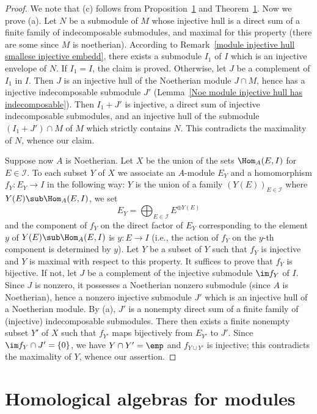\begin{proof}
We note that (c) follows from Proposition~\ref{} and Theorem~\ref{}. Now we prove (a). Let $N$ be a submodule of $M$ whose injective hull is a direct sum of a finite family of indecomposable submodules, and maximal for this property (there are some since $M$ is noetherian). According to Remark~\ref{module injective hull smallese injective embedd}, there exists a submodule $I_1$ of $I$ which is an injective envelope of $N$. If $I_1=I$, the claim is proved. Otherwise, let $J$ be a complement of $I_1$ in $I$. Then $J$ is an injective hull of the Noetherian module $J\cap M$, hence has a injective indecomposable submodule $J'$ (Lemma~\ref{Noe module injective hull has indecomposable}). Then $I_1+J'$ is injective, a direct sum of injective indecomposable submodules, and an injective hull of the submodule $(I_1+J')\cap M$ of $M$ which strictly contains $N$. This contradicts the maximality of $N$, whence our claim.\par
Suppose now $A$ is Noetherian. Let $X$ be the union of the sets $\Hom_A(E,I)$ for $E\in\mathscr{I}$. To each subset $Y$ of $X$ we associate an $A$-module $E_Y$ and a homomorphism $f_Y:E_Y\to I$ in the following way: $Y$ is the union of a family $(Y(E))_{E\in\mathscr{I}}$ where $Y(E)\sub\Hom_A(E,I)$, we set
\[E_Y=\bigoplus_{E\in\mathscr{I}}E^{\oplus Y(E)}\]
and the component of $f_Y$ on the direct factor of $E_Y$ corresponding to the element $y$ of $Y(E)\sub\Hom_A(E,I)$ is $y:E\to I$ (i.e., the action of $f_Y$ on the $y$-th component is determined by $y$). Let $Y$ be a subset of $Y$ such that $f_Y$ is injective and $Y$ is maximal with respect to this property. It suffices to prove that $f_Y$ is bijective. If not, let $J$ be a complement of the injective submodule $\im f_Y$ of $I$. Since $J$ is nonzero, it possesses a Noetherian nonzero submodule (since $A$ is Noetherian), hence a nonzero injective submodule $J'$ which is an injective hull of a Noetherian module. By (a), $J'$ is a nonempty direct sum of a finite family of (injective) indecomposable submodules. There then exists a finite nonempty subset $Y'$ of $X$ such that $f_{Y'}$ maps bijectively from $E_{Y'}$ to $J'$. Since $\im f_{Y}\cap J'=\{0\}$, we have $Y\cap Y'=\emp$ and $f_{Y\cup Y'}$ is injective; this contradicts the maximality of $Y$, whence our assertion.
\end{proof}
\chapter{Homological algebras for modules}
